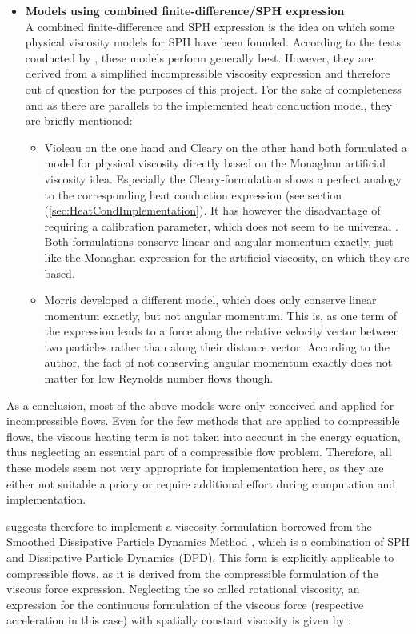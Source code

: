 \documentclass[11pt,a4paper,twoside]{report}
\begin{document}
\begin{itemize}
\item {\bf Models using combined finite-difference/SPH expression}\\
A combined finite-difference and SPH expression is the idea on which some physical viscosity models for SPH have been founded. According to the tests conducted by \cite{Basa2009}, these models perform generally best. However, they are derived from a simplified incompressible viscosity expression and therefore out of question for the purposes of this project. For the sake of completeness and as there are parallels to the implemented heat conduction model, they are briefly mentioned:
\begin{itemize}
 \item Violeau on the one hand and Cleary on the other hand both formulated a model for physical viscosity directly based on the Monaghan artificial viscosity idea. Especially the Cleary-formulation shows a perfect analogy to the corresponding heat conduction expression (see section (\ref{sec:HeatCondImplementation}).
 It has however the disadvantage of requiring a calibration parameter, which does not seem to be universal \cite{Basa2009}.
Both formulations conserve linear and angular momentum exactly, just like the Monaghan expression for the artificial viscosity, on which they are based.	
\item Morris \cite{Morris1997} developed a different model, which does only conserve linear momentum exactly, but not angular momentum. This is, as one term of the expression leads to a force along the relative velocity vector between two particles rather than along their distance vector. According to the author, the fact of not conserving angular momentum exactly does not matter for low Reynolds number flows though. 

\end{itemize}
\end{itemize}

As a conclusion, most of the above models were only conceived and applied for incompressible flows. Even for the few methods that are applied to compressible flows, the viscous heating term is not taken into account in the energy equation, thus neglecting an essential part of a compressible flow problem.
Therefore, all these models seem not very appropriate for implementation here, as they are either not suitable a priory or require additional effort during computation and implementation.

\cite{LitvinovPersCom} suggests therefore to implement a viscosity formulation borrowed from the Smoothed Dissipative Particle Dynamics Method \cite{Espanol2003}, which is a combination of SPH and Dissipative Particle Dynamics (DPD). This form is explicitly applicable to compressible flows, as it is derived from the compressible formulation of the viscous force expression.
Neglecting the so called rotational viscosity, an expression for the continuous formulation of the viscous force (respective acceleration in this case) with spatially constant viscosity is given by  \cite{deGroot1962}:
\end{document}
